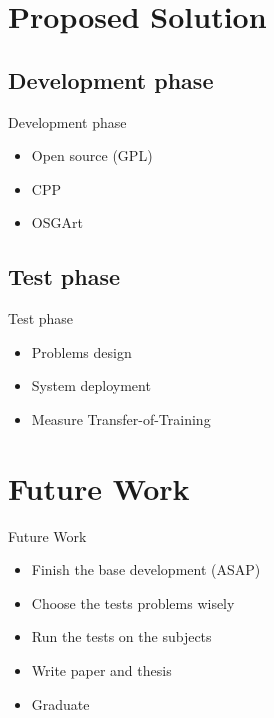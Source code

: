 \section {Proposed Solution}

\subsection {Development phase}
\begin{frame} {Development phase}
\begin{itemize}
\pause \item Open source (GPL)
\pause \item CPP
\pause \item OSGArt
\end{itemize}
\end{frame}

\subsection {Test phase}
\begin{frame} {Test phase}
\begin{itemize}
\pause \item Problems design
\pause \item System deployment
\pause \item Measure Transfer-of-Training
\end{itemize}
\end{frame}



\section {Future Work}

\begin{frame}{Future Work}
\begin{itemize}
\pause \item Finish the base development (ASAP)
\pause \item Choose the tests problems wisely
\pause \item Run the tests on the subjects
\pause \item Write paper and thesis
\pause \item Graduate
\end{itemize}
\end{frame}
